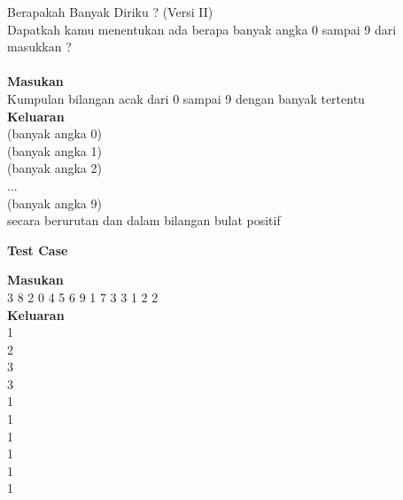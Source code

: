 \newpage
\begin{permasalahan}{Berapakah Banyak Diriku ? (Versi II) }\\
\label{prob:BanyakDiriku2}
	 Dapatkah kamu menentukan ada berapa banyak angka 0 sampai 9 dari masukkan ?\\\\
	\textbf{Masukan}\\
	Kumpulan bilangan acak dari 0 sampai 9 dengan banyak tertentu\\
	\textbf{Keluaran}\\
	(banyak angka 0)\\(banyak angka 1)\\(banyak angka 2)\\...\\(banyak angka 9)\\secara berurutan dan dalam bilangan bulat positif
	\begin{center}
	\textbf{Test Case}\\
	\end{center}
	\textbf{Masukan}\\
	3 
	8  
	2 
	0 
	4 
	5 
	6 
	9 
	1 
	7 
	3 
	3 
	1 
	2 
	2 \\
	\textbf{Keluaran}\\
		1\\2\\3\\3\\1\\1\\1\\1\\1\\1
\end{permasalahan}



%

%

%
%
%
%
%
%


